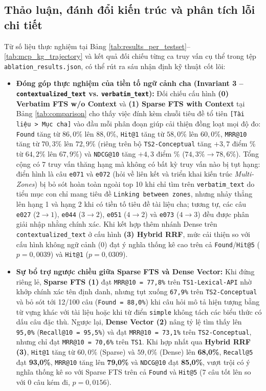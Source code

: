 \subsection{Thảo luận, đánh đổi kiến trúc và phân tích lỗi chi tiết}
Từ số liệu thực nghiệm tại Bảng \ref{tab:results_per_testset}--\ref{tab:mcp_kg_trajectory} và kết quả đối chiếu từng ca truy vấn cụ thể trong tệp \nolinkurl{ablation_results.json}, có thể rút ra sáu nhận định kỹ thuật cốt lõi:

\begin{itemize}
    \item \textbf{Đóng góp thực nghiệm của tiền tố ngữ cảnh cha (Invariant 3 -- \texttt{contextualized\_text} vs. \texttt{verbatim\_text}):} Đối chiếu cấu hình \textbf{(0) Verbatim FTS w/o Context} và \textbf{(1) Sparse FTS with Context} tại Bảng \ref{tab:comparison} cho thấy việc đính kèm chuỗi tiêu đề tổ tiên \texttt{[Tài liệu > Mục cha]} vào đầu mỗi phân đoạn giúp cải thiện đồng loạt mọi độ đo: \texttt{Found} tăng từ $86,0\%$ lên $88,0\%$, \texttt{Hit@1} tăng từ $58,0\%$ lên $60,0\%$, \texttt{MRR@10} tăng từ $70,3\%$ lên $72,9\%$ (riêng trên bộ \texttt{TS2-Conceptual} tăng $+3,7$ điểm \% từ $64,2\%$ lên $67,9\%$) và \texttt{NDCG@10} tăng $+4,3$ điểm \% ($74,3\% \to 78,6\%$). Tổng cộng có 7 truy vấn thăng hạng mà không có bất kỳ truy vấn nào bị tụt hạng: điển hình là câu \texttt{e071} và \texttt{e072} (hỏi về liên kết và triển khai kiến trúc \textit{Multi-Zones}) bị bỏ sót hoàn toàn ngoài top 10 khi chỉ tìm trên \texttt{verbatim\_text} do tiểu mục con chỉ mang tiêu đề \texttt{Linking between zones}, nhưng nhảy thẳng lên hạng 1 và hạng 2 khi có tiền tố tiêu đề tài liệu cha; tương tự, các câu \texttt{e027} ($2 \to 1$), \texttt{e044} ($3 \to 2$), \texttt{e051} ($4 \to 2$) và \texttt{e073} ($4 \to 3$) đều được phân giải nhập nhằng chính xác. Khi kết hợp thêm nhánh Dense trên \texttt{contextualized\_text} ở cấu hình \textbf{(3) Hybrid RRF}, mức cải thiện so với cấu hình không ngữ cảnh (0) đạt ý nghĩa thống kê cao trên cả \texttt{Found}/\texttt{Hit@5} ($p = 0,0039$) và \texttt{Hit@1} ($p = 0,0309$).
    \item \textbf{Sự bổ trợ ngược chiều giữa Sparse FTS và Dense Vector:} Khi đứng riêng lẻ, \textbf{Sparse FTS (1)} đạt \texttt{MRR@10 = 77,8\%} trên \texttt{TS1-Lexical-API} nhờ khớp chính xác tên định danh, nhưng tụt xuống \texttt{67,9\%} trên \texttt{TS2-Conceptual} và bỏ sót tới 12/100 câu (\texttt{Found = 88,0\%}) khi câu hỏi mô tả hiện tượng bằng từ vựng khác với tài liệu hoặc khi từ điển \texttt{simple} không tách các biểu thức có dấu câu đặc thù. Ngược lại, \textbf{Dense Vector (2)} nâng tỷ lệ tìm thấy lên \texttt{95,0\%} (\texttt{Recall@10 = 95,5\%}) và đạt \texttt{MRR@10 = 73,1\%} trên \texttt{TS2-Conceptual}, nhưng chỉ đạt \texttt{MRR@10 = 70,6\%} trên \texttt{TS1}. Khi hợp nhất qua \textbf{Hybrid RRF (3)}, \texttt{Hit@1} tăng từ $60,0\%$ (Sparse) và $59,0\%$ (Dense) lên \textbf{68,0\%}, \texttt{Recall@5} đạt \textbf{93,0\%}, \texttt{MRR@10} tăng lên \textbf{79,0\%} và \texttt{NDCG@10} đạt \textbf{85,0\%}, vượt trội có ý nghĩa thống kê so với Sparse FTS trên cả \texttt{Found} và \texttt{Hit@5} ($7$ câu tốt lên so với $0$ câu kém đi, $p = 0,0156$).

\end{itemize}
